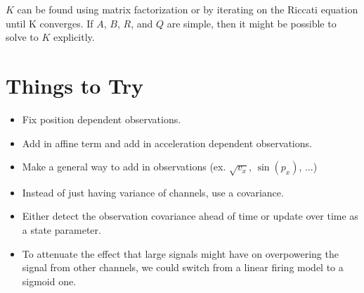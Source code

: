 \documentclass[]{article}
\begin{document}
$K$ can be found using matrix factorization or by iterating on the Riccati equation until K converges.
If $A$, $B$, $R$, and $Q$ are simple, then it might be possible to solve to $K$ explicitly.



\section{Things to Try}

\begin{itemize}
\item Fix position dependent observations.
\item Add in affine term and add in acceleration dependent observations.
\item Make a general way to add in observations (ex. $\sqrt{v_x}$, $\sin(p_x)$, ...)
\item Instead of just having variance of channels, use a covariance.
\item Either detect the observation covariance ahead of time or update over time as a state parameter.
\item To attenuate the effect that large signals might have on overpowering the signal from other channels, we could switch from a linear firing model to a sigmoid one.
\end{itemize}
\end{document}
